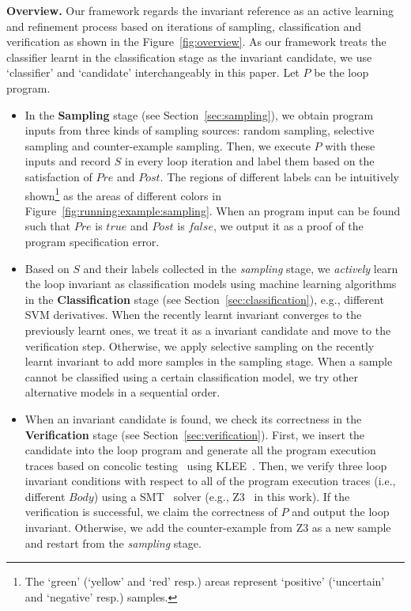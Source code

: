\medskip\noindent
\textbf{Overview.}
Our framework regards the invariant reference as an active learning and refinement process 
based on iterations of sampling, classification and verification 
as shown in the Figure~\ref{fig:overview}. 
As our framework treats the classifier learnt in the classification stage as the invariant candidate,
we use `classifier' and `candidate' interchangeably in this paper.
Let $P$ be the loop program. 
\begin{itemize}
    \item 
    In the \textbf{Sampling} stage (see Section~\ref{sec:sampling}), 
    we obtain program inputs from three kinds of sampling sources: 
    random sampling, selective sampling and counter-example sampling. 
    Then, we execute $P$ with these inputs and record $S$ in every loop iteration 
    and label them based on the satisfaction of $\mathit{Pre}$ and $\mathit{Post}$. 
    The regions of different labels can be intuitively shown\footnote{
        The `green' (`yellow' and `red' resp.) areas 
        represent `positive' (`uncertain' and `negative' resp.) samples. 
    } as the areas of different colors in Figure~\ref{fig:running:example:sampling}. 
    When an program input can be found such that 
    $\mathit{Pre}$ is $\mathit{true}$ and $\mathit{Post}$ is $\mathit{false}$, 
    we output it as a proof of the program specification error. 
    \item 
    Based on $S$ and their labels collected in the \emph{sampling} stage, 
    we \emph{actively} learn the loop invariant as classification models 
    using machine learning algorithms 
    in the \textbf{Classification} stage (see Section~\ref{sec:classification}), 
    e.g., different SVM derivatives. 
    When the recently learnt invariant converges to the previously learnt ones, 
    we treat it as a invariant candidate and move to the verification step. 
    Otherwise, we apply selective sampling on the recently learnt invariant 
    to add more samples in the sampling stage. 
    When a sample cannot be classified using a certain classification model, 
    we try other alternative models in a sequential order. 
    \item 
    When an invariant candidate is found, 
    we check its correctness in the \textbf{Verification} stage (see Section~\ref{sec:verification}). 
    First, we insert the candidate into the loop program and generate all the program execution traces 
    based on concolic testing~\cite{sen2007concolic} using KLEE~\cite{cadar2008klee}. 
    Then, we verify three loop invariant conditions 
    with respect to all of the program execution traces (i.e., different $\mathit{Body}$) 
    using a SMT~\cite{barrett2009satisfiability} solver (e.g., Z3~\cite{de2008z3} in this work). 
    If the verification is successful, we claim the correctness of $P$ and output the loop invariant. 
    Otherwise, we add the counter-example from Z3 as a new sample 
    and restart from the \emph{sampling} stage. 
\end{itemize}
